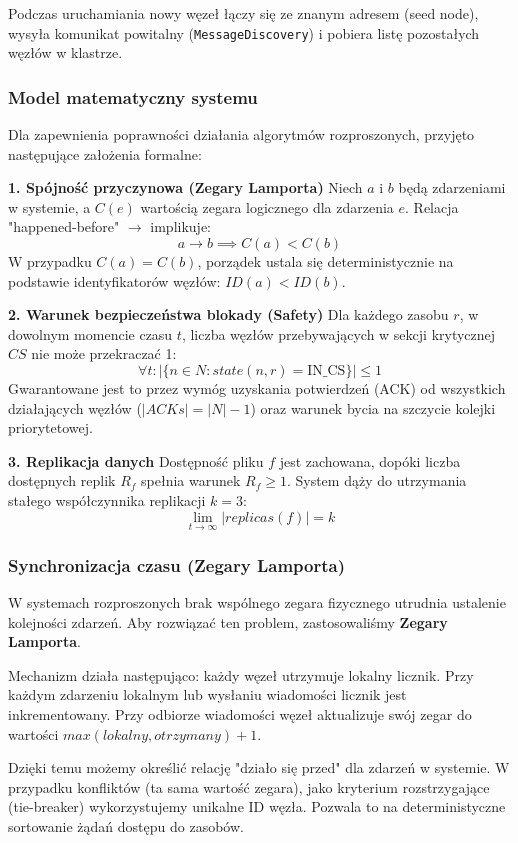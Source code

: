 \documentclass[12pt,a4paper]{article}
\begin{document}
	Podczas uruchamiania nowy węzeł łączy się ze znanym adresem (seed node), wysyła komunikat powitalny (\texttt{MessageDiscovery}) i pobiera listę pozostałych węzłów w klastrze.

	\subsubsection{Model matematyczny systemu}
	Dla zapewnienia poprawności działania algorytmów rozproszonych, przyjęto następujące założenia formalne:
	
	\textbf{1. Spójność przyczynowa (Zegary Lamporta)}
	Niech $a$ i $b$ będą zdarzeniami w systemie, a $C(e)$ wartością zegara logicznego dla zdarzenia $e$. Relacja "happened-before" $\rightarrow$ implikuje:
	$$ a \rightarrow b \implies C(a) < C(b) $$
	W przypadku $C(a) = C(b)$, porządek ustala się deterministycznie na podstawie identyfikatorów węzłów: $ID(a) < ID(b)$.
	
	\textbf{2. Warunek bezpieczeństwa blokady (Safety)}
	Dla każdego zasobu $r$, w dowolnym momencie czasu $t$, liczba węzłów przebywających w sekcji krytycznej $CS$ nie może przekraczać 1:
	$$ \forall t: |\{ n \in N : state(n, r) = \text{IN\_CS} \}| \le 1 $$
	Gwarantowane jest to przez wymóg uzyskania potwierdzeń (ACK) od wszystkich działających węzłów ($|ACKs| = |N| - 1$) oraz warunek bycia na szczycie kolejki priorytetowej.
	
	\textbf{3. Replikacja danych}
	Dostępność pliku $f$ jest zachowana, dopóki liczba dostępnych replik $R_f$ spełnia warunek $R_f \ge 1$. System dąży do utrzymania stałego współczynnika replikacji $k=3$:
	$$ \lim_{t \to \infty} |replicas(f)| = k $$
	
	\subsubsection{Synchronizacja czasu (Zegary Lamporta)}
	W systemach rozproszonych brak wspólnego zegara fizycznego utrudnia ustalenie kolejności zdarzeń. Aby rozwiązać ten problem, zastosowaliśmy \textbf{Zegary Lamporta}.
	
	Mechanizm działa następująco: każdy węzeł utrzymuje lokalny licznik. Przy każdym zdarzeniu lokalnym lub wysłaniu wiadomości licznik jest inkrementowany. Przy odbiorze wiadomości węzeł aktualizuje swój zegar do wartości $max(lokalny, otrzymany) + 1$.
	
	Dzięki temu możemy określić relację "działo się przed" dla zdarzeń w systemie. W przypadku konfliktów (ta sama wartość zegara), jako kryterium rozstrzygające (tie-breaker) wykorzystujemy unikalne ID węzła. Pozwala to na deterministyczne sortowanie żądań dostępu do zasobów.
\end{document}
